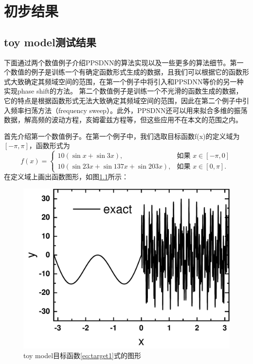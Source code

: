 \chapter[初步结果]{初步结果}
\label{chap3}
\section{toy model测试结果}
下面通过两个数值例子介绍PPSDNN的算法实现以及一些更多的算法细节。第一个数值的例子是训练一个有确定函数形式生成的数据，且我们可以根据它的函数形式大致确定其频域空间的范围，在第一个例子中将引入和PPSDNN等价的另一种实现phase shift的方法。
第二个数值例子是训练一个不光滑的函数生成的数据，它的特点是根据函数形式无法大致确定其频域空间的范围，因此在第二个例子中引入频率扫荡方法（frequency sweep）。此外，PPSDNN还可以用来拟合多维的振荡数据，解高频的波动方程，亥姆霍兹方程等，但这些应用不在本文的范围之内。

首先介绍第一个数值例子。在第一个例子中，我们选取目标函数f(x)的定义域为$[-\pi,\pi]$，函数形式为
\begin{equation}\label{eq:target1}
    f(x) = \begin{cases}
             10(\sin x + \sin 3x), & \mbox{如果 } x\in [-\pi,0] \\
             10(\sin 23x + \sin 137x + \sin 203x), & \mbox{如果 }x\in [0,\pi].
           \end{cases}
  \end{equation}
在定义域上画出函数图形，如图\ref{toy}所示：
\begin{figure}[htbp]
  \centering
  \includegraphics[width=0.76\linewidth]{figures/toymodel/exact.pdf}
  \caption{toy model目标函数\ref{eq:target1}式的图形}
  \label{toy}
\end{figure}

